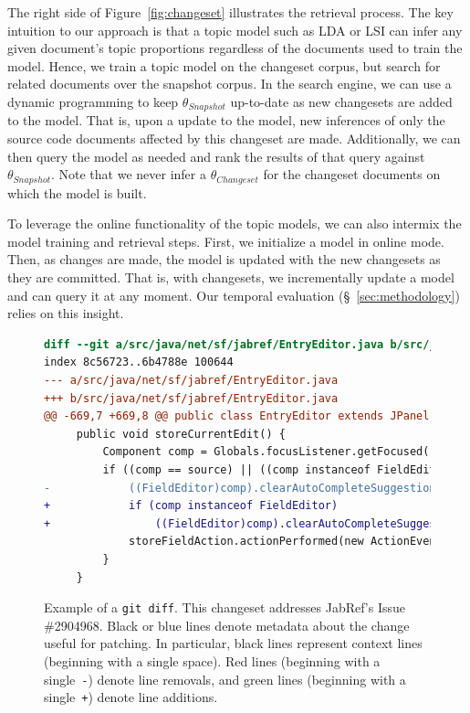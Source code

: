 The right side of Figure~\ref{fig:changeset} illustrates the retrieval process.
The key intuition to our approach is that a topic model such as LDA or LSI
can infer any given document's topic proportions regardless of the documents used to train the model.
Hence, we train a topic model on the changeset corpus,
but search for related documents over the snapshot corpus.
In the search engine, we can use a dynamic programming to
keep $\theta_{Snapshot}$ up-to-date as new changesets are added to the model.
That is, upon a update to the model, new inferences of only the source code documents affected by this changeset are made.
Additionally, we can then query the model as needed
and rank the results of that query against $\theta_{Snapshot}$.
Note that we never infer a $\theta_{Changeset}$
for the changeset documents on which the model is built.

To leverage the online functionality of the topic models,
we can also intermix the model training and retrieval steps.
First, we initialize a model in online mode.
Then, as changes are made, the model is updated with the new changesets as they are committed.
That is, with changesets, we incrementally update a model and can query it at any moment.
Our temporal evaluation (\S~\ref{sec:methodology}) relies on this insight.



\begin{figure}[t]
\centering
\footnotesize
\begin{lstlisting}[language=diff, basicstyle=\ttfamily]
diff --git a/src/java/net/sf/jabref/EntryEditor.java b/src/java/net/sf/jabref/EntryEditor.java
index 8c56723..6b4788e 100644
--- a/src/java/net/sf/jabref/EntryEditor.java
+++ b/src/java/net/sf/jabref/EntryEditor.java
@@ -669,7 +669,8 @@ public class EntryEditor extends JPanel implements VetoableChangeListener {
     public void storeCurrentEdit() {
         Component comp = Globals.focusListener.getFocused();
         if ((comp == source) || ((comp instanceof FieldEditor) && this.isAncestorOf(comp))) {
-            ((FieldEditor)comp).clearAutoCompleteSuggestion();
+            if (comp instanceof FieldEditor)
+                ((FieldEditor)comp).clearAutoCompleteSuggestion();
             storeFieldAction.actionPerformed(new ActionEvent(comp, 0, ""));
         }
     }
\end{lstlisting}
\caption{Example of a \texttt{git diff}.
This changeset addresses JabRef's Issue \#2904968.
Black or blue lines denote metadata about the change useful for patching.
In particular, black lines represent context lines (beginning with a single space).
Red lines (beginning with a single~\texttt{-}) denote line removals,
and green lines (beginning with a single~\texttt{+}) denote line additions.}
\label{fig:diff}
\vspace{-10pt}
\end{figure}

